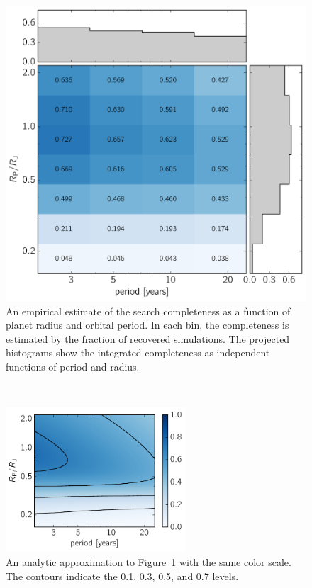 \documentclass[manuscript, letterpaper]{aastex6}
\newcommand{\dfmfigref}[1]{\ref{fig:#1}}
\newcommand{\dfmFig}[1]{Figure~\dfmfigref{#1}}
\newcommand{\dfmfig}[1]{\dfmFig{#1}}
\newcommand{\dfmfiglabel}[1]{\label{fig:#1}}
\begin{document}
\begin{figure}[p]~\\
\begin{center}
\includegraphics[width=\textwidth]{figures/completeness.pdf}
\end{center}
\caption{%
An empirical estimate of the search completeness as a function of planet
radius and orbital period.
In each bin, the completeness is estimated by the fraction of recovered
simulations.
The projected histograms show the integrated completeness as independent
functions of period and radius.
\dfmfiglabel{completeness}}
\end{figure}

\begin{figure}[htbp]~\\
\begin{center}
\includegraphics[width=0.6\textwidth]{figures/completeness_analytic.pdf}
\end{center}
\caption{%
An analytic approximation to \dfmfig{completeness} with the same color scale.
The contours indicate the 0.1, 0.3, 0.5, and 0.7 levels.
\dfmfiglabel{completeness-analytic}}
\end{figure}
\end{document}
